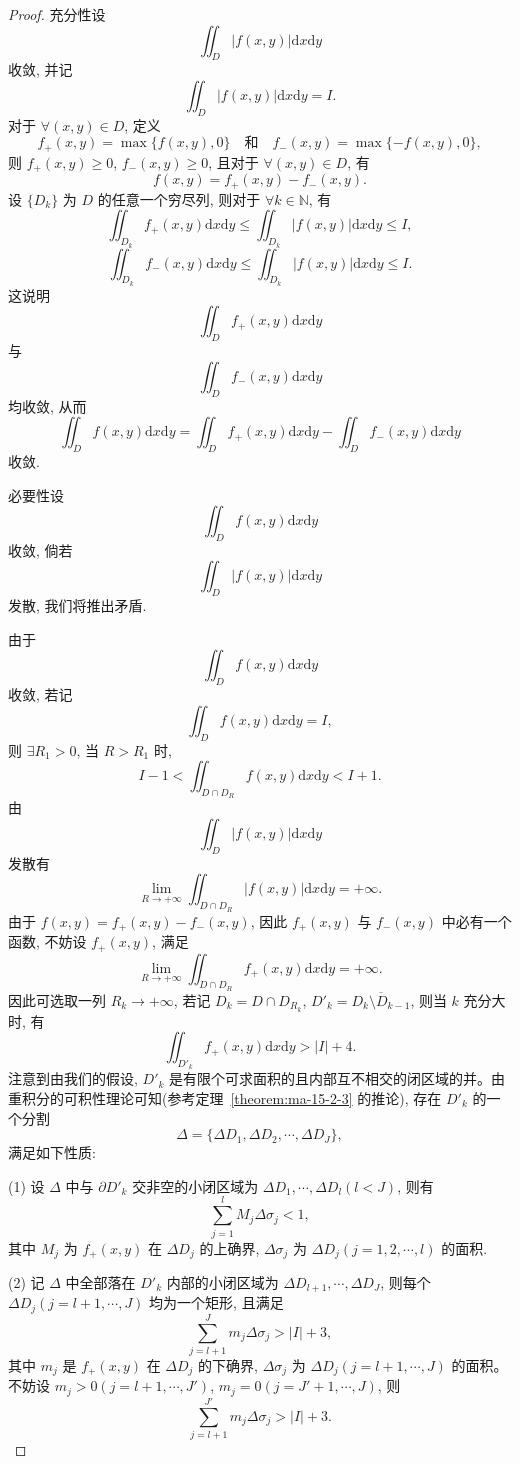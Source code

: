 \begin{proof}
充分性\quad 设
\[
  \iint_D |f(x,y)|\mathrm dx\mathrm dy
\]
收敛, 并记
\[
  \iint_D |f(x,y)|\mathrm dx\mathrm dy=I.
\]
对于 $\forall(x,y)\in D$, 定义
\[
  f_+(x,y)=\max\{f(x,y),0\}\quad\text{和}\quad f_-(x,y)=\max\{-f(x,y),0\},
\]
则 $f_+(x,y)\geqslant0$, $f_-(x,y)\geqslant0$, 且对于 $\forall(x,y)\in D$, 有
\[
  f(x,y)=f_+(x,y)-f_-(x,y).
\]
设 $\{D_k\}$ 为 $D$ 的任意一个穷尽列, 则对于 $\forall k\in\mathbb N$, 有
\[
  \iint_{D_k}f_+(x,y)\mathrm dx\mathrm dy
  \leqslant\iint_{D_k}|f(x,y)|\mathrm dx\mathrm dy\leqslant I,
\]
\[
  \iint_{D_k}f_-(x,y)\mathrm dx\mathrm dy
  \leqslant\iint_{D_k}|f(x,y)|\mathrm dx\mathrm dy\leqslant I.
\]
这说明
\[
  \iint_D f_+(x,y)\mathrm dx\mathrm dy
\]
与
\[
  \iint_D f_-(x,y)\mathrm dx\mathrm dy
\]
均收敛, 从而
\[
  \iint_D f(x,y)\mathrm dx\mathrm dy
  =\iint_D f_+(x,y)\mathrm dx\mathrm dy
  -\iint_D f_-(x,y)\mathrm dx\mathrm dy
\]
收敛.

必要性\quad 设
\[
  \iint_D f(x,y)\mathrm dx\mathrm dy
\]
收敛, 倘若
\[
  \iint_D |f(x,y)|\mathrm dx\mathrm dy
\]
发散, 我们将推出矛盾.

由于
\[
  \iint_D f(x,y)\mathrm dx\mathrm dy
\]
收敛, 若记
\[
  \iint_D f(x,y)\mathrm dx\mathrm dy=I,
\]
则 $\exists R_1>0$, 当 $R>R_1$ 时,
\[
  I-1<\iint_{D\cap D_R}f(x,y)\mathrm dx\mathrm dy<I+1.
\]
由
\[
  \iint_D |f(x,y)|\mathrm dx\mathrm dy
\]
发散有
\[
  \lim_{R\to+\infty}\iint_{D\cap D_R}|f(x,y)|\mathrm dx\mathrm dy=+\infty.
\]
由于 $f(x,y)=f_+(x,y)-f_-(x,y)$, 因此 $f_+(x,y)$ 与 $f_-(x,y)$ 中必有一个函数, 不妨设 $f_+(x,y)$, 满足
\[
  \lim_{R\to+\infty}\iint_{D\cap D_R}f_+(x,y)\mathrm dx\mathrm dy=+\infty.
\]
因此可选取一列 $R_k\to+\infty$, 若记 $D_k=D\cap D_{R_k}$, $D'_k=\overline{D_k\setminus D_{k-1}}$, 则当 $k$ 充分大时, 有
\[
  \iint_{D'_k}f_+(x,y)\mathrm dx\mathrm dy>|I|+4.
\]
注意到由我们的假设, $D'_k$ 是有限个可求面积的且内部互不相交的闭区域的并。由重积分的可积性理论可知(参考定理~\ref{theorem:ma-15-2-3} 的推论), 存在 $D'_k$ 的一个分割
\[
  \Delta=\{\Delta D_1,\Delta D_2,\cdots,\Delta D_J\},
\]
满足如下性质:

(1) 设 $\Delta$ 中与 $\partial D'_k$ 交非空的小闭区域为 $\Delta D_1,\cdots,\Delta D_l(l<J)$, 则有
\[
  \sum_{j=1}^l M_j\Delta\sigma_j<1,
\]
其中 $M_j$ 为 $f_+(x,y)$ 在 $\Delta D_j$ 的上确界, $\Delta\sigma_j$ 为 $\Delta D_j(j=1,2,\cdots,l)$ 的面积.

(2) 记 $\Delta$ 中全部落在 $D'_k$ 内部的小闭区域为 $\Delta D_{l+1},\cdots,\Delta D_J$, 则每个 $\Delta D_j(j=l+1,\cdots,J)$ 均为一个矩形, 且满足
\[
  \sum_{j=l+1}^J m_j\Delta\sigma_j>|I|+3,
\]
其中 $m_j$ 是 $f_+(x,y)$ 在 $\Delta D_j$ 的下确界, $\Delta\sigma_j$ 为 $\Delta D_j(j=l+1,\cdots,J)$ 的面积。不妨设 $m_j>0(j=l+1,\cdots,J')$, $m_j=0(j=J'+1,\cdots,J)$, 则
\[
  \sum_{j=l+1}^{J'}m_j\Delta\sigma_j>|I|+3.
\]


\end{proof}
